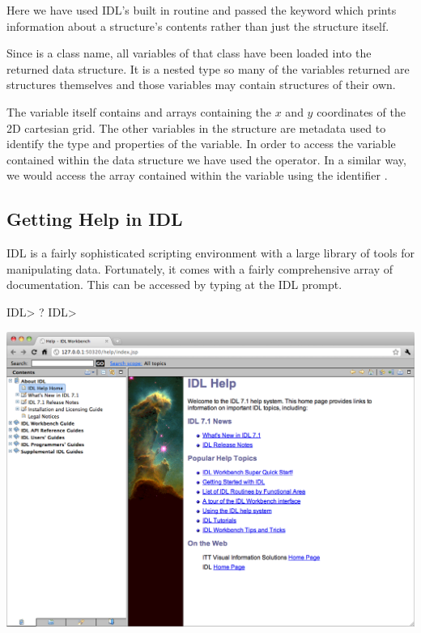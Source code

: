   Here we have used IDL's built in  routine and passed the
   keyword which prints information about a structure's
  contents rather than just the structure itself.

  Since  is a class name, all variables of that class have
  been loaded into the returned data structure. It is a nested type
  so many of the variables returned are structures themselves and those
  variables may contain structures of their own.

  The  variable itself contains  and  arrays
  containing the $x$ and $y$ coordinates of the 2D cartesian grid. The
  other variables in the  structure are metadata used to identify
  the type and properties of the variable.
  In order to access the  variable contained within the
   data structure we have used the  operator.
  In a similar way, we would access the  array contained within
  the  variable using the identifier .

\subsection{Getting Help in IDL}
  IDL is a fairly sophisticated scripting environment with a large
  library of tools for manipulating data. Fortunately, it comes with a
  fairly comprehensive array of documentation. This can be accessed by
  typing  at the IDL prompt.

\begin{boxverbatim}
IDL> ?
IDL>
\end{boxverbatim}
  \begin{center}
    \includegraphics[width=0.8\linewidth]{images/idl_help}
  \end{center}

